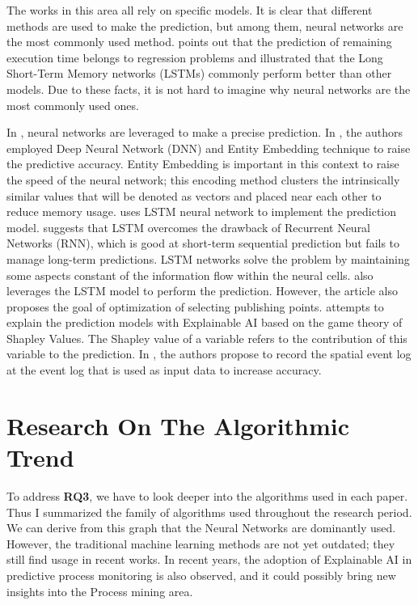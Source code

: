 \documentclass[runningheads]{llncs}
\begin{document}
		The works in this area all rely on specific models. It is clear that different methods are used to make the prediction, but among them, neural networks are the most commonly used method. \cite{art-29} points out that the prediction of remaining execution time belongs to regression problems and \cite{art-17} illustrated that the Long Short-Term Memory networks (LSTMs) commonly perform better than other models. Due to these facts, it is not hard to imagine why neural networks are the most commonly used ones.
		
		In\cite{art-15} \cite{art-21} \cite{art-29}, neural networks are leveraged to make a precise prediction. In \cite{art-15}, the authors employed Deep Neural Network (DNN) and Entity Embedding technique to raise the predictive accuracy. Entity Embedding is important in this context to raise the speed of the neural network; this encoding method clusters the intrinsically similar values that will be denoted as vectors and placed near each other to reduce memory usage. \cite{art-21} uses LSTM neural network to implement the prediction model. \cite{art-21} suggests that LSTM overcomes the drawback of Recurrent Neural Networks (RNN), which is good at short-term sequential prediction but fails to manage long-term predictions. LSTM networks solve the problem by maintaining some aspects constant of the information flow within the neural cells. \cite{art-29} also leverages the LSTM model to perform the prediction. However, the article also proposes the goal of optimization of selecting publishing points. \cite{art-17} attempts to explain the prediction models with Explainable AI based on the game theory of Shapley Values. The Shapley value of a variable refers to the contribution of this variable to the prediction. In \cite{art-13}, the authors propose to record the spatial event log at the event log that is used as input data to increase accuracy.       

				
		
		\section{Research On The Algorithmic Trend}
		
		To address \textbf{RQ3}, we have to look deeper into the algorithms used in each paper. Thus I summarized the family of algorithms used throughout the research period. We can derive from this graph that the Neural Networks are dominantly used. However, the traditional machine learning methods are not yet outdated; they still find usage in recent works. In recent years, the adoption of Explainable AI in predictive process monitoring is also observed, and it could possibly bring new insights into the Process mining area.       
		
\end{document}
